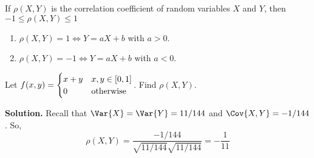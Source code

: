 \begin{Theorem}{}{}
    If $ \rho(X,Y) $ is the correlation coefficient
    of random variables $ X $ and $ Y $, then
    $ -1\le \rho(X,Y)\le 1 $
    \begin{enumerate}[label=(\arabic*)]
        \item $ \rho(X,Y)=1\iff Y=aX+b $ with $ a>0 $.
        \item $ \rho(X,Y)=-1\iff Y=aX+b $ with $ a<0 $.
    \end{enumerate}
\end{Theorem}
\begin{Example}{}{}
    Let $ \displaystyle f(x,y)=\begin{cases}
            x+y & x,y\in\interval{0}{1} \\
            0   & \text{otherwise}
        \end{cases} $.
    Find $ \rho(X,Y) $.

    \textbf{Solution.} Recall that $ \Var{X}=\Var{Y}=11/144 $
    and $ \Cov{X,Y}=-1/144 $. So,
    \[ \rho(X,Y)=\frac{-1/144}{\sqrt{11/144}\sqrt{11/144}} =-\frac{1}{11}  \]

\end{Example}
